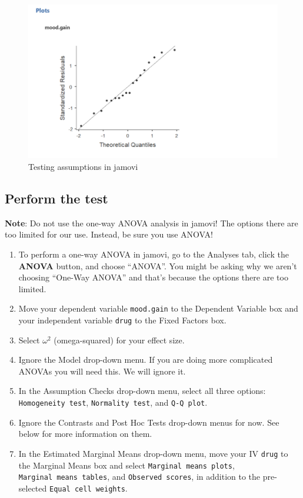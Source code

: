 \documentclass[
]{book}
\begin{document}
\begin{figure}

{\centering \includegraphics[width=1\linewidth]{images/04_one-way-anova/one-way_assumptions2} 

}

\caption{Testing assumptions in jamovi}\label{fig:unnamed-chunk-2}
\end{figure}

\hypertarget{perform-the-test-6}{%
\subsection{Perform the test}\label{perform-the-test-6}}

\textbf{Note}: Do not use the one-way ANOVA analysis in jamovi! The options there are too limited for our use. Instead, be sure you use ANOVA!

\begin{enumerate}
\def\labelenumi{\arabic{enumi}.}
\item
  To perform a one-way ANOVA in jamovi, go to the Analyses tab, click the \textbf{ANOVA} button, and choose ``ANOVA''. You might be asking why we aren't choosing ``One-Way ANOVA'' and that's because the options there are too limited.
\item
  Move your dependent variable \texttt{mood.gain} to the Dependent Variable box and your independent variable \texttt{drug} to the Fixed Factors box.
\item
  Select \(\omega^2\) (omega-squared) for your effect size.
\item
  Ignore the Model drop-down menu. If you are doing more complicated ANOVAs you will need this. We will ignore it.
\item
  In the Assumption Checks drop-down menu, select all three options: \texttt{Homogeneity\ test}, \texttt{Normality\ test}, and \texttt{Q-Q\ plot}.
\item
  Ignore the Contrasts and Post Hoc Tests drop-down menus for now. See below for more information on them.
\item
  In the Estimated Marginal Means drop-down menu, move your IV \texttt{drug} to the Marginal Means box and select \texttt{Marginal\ means\ plots}, \texttt{Marginal\ means\ tables}, and \texttt{Observed\ scores}, in addition to the pre-selected \texttt{Equal\ cell\ weights}.
\end{enumerate}
\end{document}
